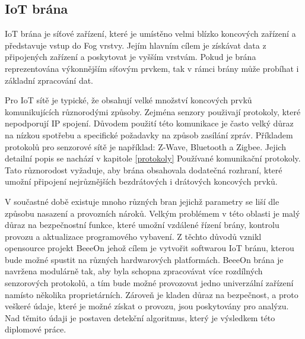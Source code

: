  \subsection{IoT brána} 
 IoT brána je síťové zařízení, které je umístěno velmi blízko koncových zařízení
 a představuje vstup do Fog vrstvy. Jejím hlavním cílem je získávat data 
 z připojených zařízení a poskytovat je vyšším vrstvám. Pokud je brána reprezentována
 výkonnějším síťovým prvkem, tak v rámci brány může probíhat i základní zpracování
 dat. 
 
 Pro IoT sítě je typické, že obsahují velké množství koncových prvků komunikujících
 různorodými způsoby. Zejména senzory použivají protokoly, které nepodporují
 IP spojení. Důvodem použití této komunikace je často velký
 důraz na nízkou spotřebu a specifické požadavky na způsob zasílání zpráv.
 Příkladem protokolů pro senzorové sítě je například:
 Z-Wave, Bluetooth a Zigbee. Jejich detailní popis se nachází v kapitole 
 \ref{protokoly} Používané komunikační protokoly.
 Tato různorodost vyžaduje, aby brána obsahovala dodatečná rozhraní, které 
 umožní připojení nejrůznějších bezdrátových i drátových koncových prvků. 
 
 V součastné době existuje mnoho různých bran jejichž parametry se liší dle 
 způsobu nasazení a provozních nároků. Velkým problémem v této oblasti je malý 
 důraz na bezpečnostní funkce, které umožní vzdálené řízení brány, kontrolu provozu a 
 aktualizace programového vybavení. Z těchto důvodů vznikl opensource projekt BeeeOn \cite{beeeon}
 jehož cílem je vytvořit softwarou IoT bránu, kterou bude možné spustit na různých 
 hardwarových platformách. BeeeOn brána je navržena modulárně tak, aby byla schopna 
 zpracovávat více rozdílných senzorových protokolů, a tím bude možné provozovat jedno
 univerzální zařízení namísto několika proprietárních. Zároveň je kladen důraz na bezpečnost, 
 a proto veškeré údaje, které je možné získat o provozu, jsou poskytovány pro analýzu. Nad těmito údaji
 je postaven detekční algoritmus, který je výsledkem této diplomové práce.
 

